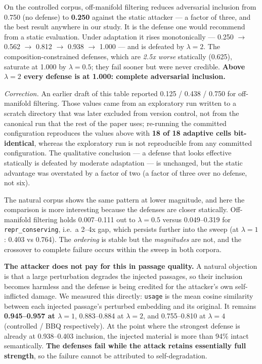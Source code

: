 \documentclass[review,3p,times]{elsarticle}
\begin{document}
On the controlled corpus, off-manifold filtering reduces adversarial inclusion from 0.750 (no defense) to \textbf{0.250} against the static attacker --- a factor of three, and the best result anywhere in our study. It is the defense one would recommend from a static evaluation. Under adaptation it rises monotonically --- 0.250 \(\rightarrow\) 0.562 \(\rightarrow\) 0.812 \(\rightarrow\) 0.938 \(\rightarrow\) 1.000 --- and is defeated by \(\lambda = 2\). The composition-constrained defenses, which are \emph{2.5x worse} statically (0.625), saturate at 1.000 by \(\lambda = 0.5\); they fail sooner but were never credible. \textbf{Above \(\lambda = 2\) every defense is at 1.000: complete adversarial inclusion.}

\emph{Correction.} An earlier draft of this table reported 0.125 / 0.438 / 0.750 for off-manifold filtering. Those values came from an exploratory run written to a scratch directory that was later excluded from version control, not from the canonical run that the rest of the paper uses; re-running the committed configuration reproduces the values above with \textbf{18 of 18 adaptive cells bit-identical}, whereas the exploratory run is not reproducible from any committed configuration. The qualitative conclusion --- a defense that looks effective statically is defeated by moderate adaptation --- is unchanged, but the static advantage was overstated by a factor of two (a factor of three over no defense, not six).

The natural corpus shows the same pattern at lower magnitude, and here the comparison is more interesting because the defenses are closer statically. Off-manifold filtering holds 0.007--0.111 out to \(\lambda = 0.5\) versus 0.049--0.319 for \texttt{repr\_conserving}, i.e.~a 2--4x gap, which persists further into the sweep (at \(\lambda = 1\): 0.403 vs 0.764). The \emph{ordering} is stable but the \emph{magnitudes} are not, and the crossover to complete failure occurs within the sweep in both corpora.

\textbf{The attacker does not pay for this in passage quality.} A natural objection is that a large perturbation degrades the injected passages, so their inclusion becomes harmless and the defense is being credited for the attacker's own self-inflicted damage. We measured this directly: \texttt{usage} is the mean cosine similarity between each injected passage's perturbed embedding and its original. It remains \textbf{0.945--0.957 at \(\lambda = 1\)}, 0.883--0.884 at \(\lambda = 2\), and 0.755--0.810 at \(\lambda = 4\) (controlled / BBQ respectively). At the point where the strongest defense is already at 0.938--0.403 inclusion, the injected material is more than 94\% intact semantically. \textbf{The defenses fail while the attack retains essentially full strength}, so the failure cannot be attributed to self-degradation.
\end{document}
